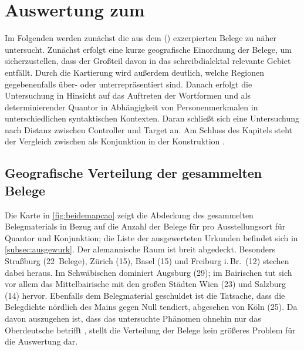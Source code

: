 \chapter{Auswertung zum }
\label{ch:caoanalyse}

Im Folgenden werden zunächst die aus dem  (\CAO{})
exzerpierten Belege zu  näher untersucht. Zunächst erfolgt eine
kurze geografische Einordnung der Belege, um sicherzustellen, dass der Großteil
davon in das schreib\-dialektal relevante Gebiet entfällt. Durch die Kartierung
wird außerdem deutlich, welche Regionen gegebenenfalls über- oder
unter\-repräsentiert sind. Danach erfolgt die Untersuchung in Hinsicht auf das
Auftreten der Wortformen  und  als determinierender
Quantor in Abhängigkeit von Personenmerkmalen in unterschiedlichen
syntaktischen Kontexten. Daran schließt sich eine Untersuchung nach Distanz
zwischen Controller und Target an. Am Schluss des Kapitels steht der Vergleich
zwischen  als Konjunk\-tion in der Konstruktion
 .

\section{Geografische Verteilung der gesammelten Belege}

Die Karte in \cref{fig:beidemapcao} zeigt die Abdeckung des gesammelten
Belegmaterials in Bezug auf die Anzahl der Belege für  pro
Ausstellungsort für Quantor und Konjunktion; die Liste der ausgewerteten
Urkunden befindet sich in \cref{subsec:ausgewurk}. Der alemannische Raum ist
breit abgedeckt. Besonders Straßburg (22~Belege), Zürich (15), Basel (15) und
Freiburg i.\,Br.\ (12) stechen dabei heraus. Im Schwäbischen dominiert Augsburg
(29); im Bairischen tut sich vor allem das Mittelbairische mit den großen
Städten Wien (23) und Salzburg (14) hervor. Ebenfalls dem Belegmaterial
geschuldet ist die Tatsache, dass die Belegdichte nördlich des Mains gegen Null
tendiert, abgesehen von Köln (25). Da davon auszugehen ist, dass das
untersuchte Phänomen ohnehin nur das Oberdeutsche betrifft
\autocite[181--184]{ksw2}, stellt die Verteilung der Belege kein größeres
Problem für die Auswertung dar.

